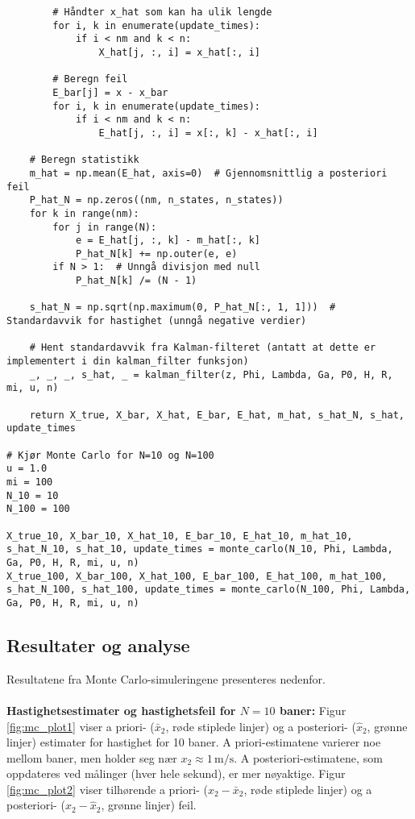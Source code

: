 \documentclass[a4paper,12pt]{article}
\theoremstyle{plain}
\begin{document}
\begin{lstlisting}
        # Håndter x_hat som kan ha ulik lengde
        for i, k in enumerate(update_times):
            if i < nm and k < n:
                X_hat[j, :, i] = x_hat[:, i]

        # Beregn feil
        E_bar[j] = x - x_bar
        for i, k in enumerate(update_times):
            if i < nm and k < n:
                E_hat[j, :, i] = x[:, k] - x_hat[:, i]

    # Beregn statistikk
    m_hat = np.mean(E_hat, axis=0)  # Gjennomsnittlig a posteriori feil
    P_hat_N = np.zeros((nm, n_states, n_states))
    for k in range(nm):
        for j in range(N):
            e = E_hat[j, :, k] - m_hat[:, k]
            P_hat_N[k] += np.outer(e, e)
        if N > 1:  # Unngå divisjon med null
            P_hat_N[k] /= (N - 1)
    
    s_hat_N = np.sqrt(np.maximum(0, P_hat_N[:, 1, 1]))  # Standardavvik for hastighet (unngå negative verdier)
    
    # Hent standardavvik fra Kalman-filteret (antatt at dette er implementert i din kalman_filter funksjon)
    _, _, _, s_hat, _ = kalman_filter(z, Phi, Lambda, Ga, P0, H, R, mi, u, n)
    
    return X_true, X_bar, X_hat, E_bar, E_hat, m_hat, s_hat_N, s_hat, update_times

# Kjør Monte Carlo for N=10 og N=100
u = 1.0
mi = 100
N_10 = 10
N_100 = 100

X_true_10, X_bar_10, X_hat_10, E_bar_10, E_hat_10, m_hat_10, s_hat_N_10, s_hat_10, update_times = monte_carlo(N_10, Phi, Lambda, Ga, P0, H, R, mi, u, n)
X_true_100, X_bar_100, X_hat_100, E_bar_100, E_hat_100, m_hat_100, s_hat_N_100, s_hat_100, update_times = monte_carlo(N_100, Phi, Lambda, Ga, P0, H, R, mi, u, n)
\end{lstlisting}
\clearpage
\subsection{Resultater og analyse}
Resultatene fra Monte Carlo-simuleringene presenteres nedenfor.
\\\\
\textbf{Hastighetsestimater og hastighetsfeil for $N=10$ baner:} \newline Figur \ref{fig:mc_plot1} viser a priori- ($\bar{x}_2$, røde stiplede linjer) og a posteriori- ($\hat{x}_2$, grønne linjer) estimater for hastighet for 10 baner. A priori-estimatene varierer noe mellom baner, men holder seg nær $x_2 \approx 1 \, \text{m/s}$. A posteriori-estimatene, som oppdateres ved målinger (hver hele sekund), er mer nøyaktige. Figur \ref{fig:mc_plot2} viser tilhørende a priori- ($x_2 - \bar{x}_2$, røde stiplede linjer) og a posteriori- ($x_2 - \hat{x}_2$, grønne linjer) feil.
\end{document}
